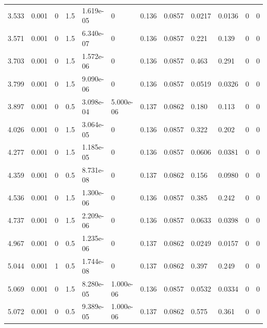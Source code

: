 \documentclass[preview]{standalone}
\begin{document}
{{\begin{tabular}{L{1.2cm}C{1.2cm} C{0.3cm}C{0.5cm} C{1.4cm}C{1.4cm} C{1.4cm}C{1.4cm} C{1.6cm}C{1.6cm} C{1.6cm}C{1.6cm}}
  3.533  &  0.001  & 0     & 1.5 &  1.619e-05  & 0  &  0.136&   0.0857& 0.0217 & 0.0136   &  0 & 0  \\ 
  3.571  &  0.001  & 0     & 1.5 &  6.340e-07  & 0  &  0.136&   0.0857& 0.221 & 0.139   &  0 & 0  \\ 
  3.703  &  0.001  & 0     & 1.5 &  1.572e-06  & 0  &  0.136&   0.0857& 0.463 & 0.291   &  0 & 0  \\ 
  3.799  &  0.001  & 0     & 1.5 &  9.090e-06  & 0  &  0.136&   0.0857& 0.0519 & 0.0326   &  0 & 0  \\ 
  3.897  &  0.001  & 0     & 0.5 &  3.098e-04  & 5.000e-06  &  0.137&   0.0862& 0.180 & 0.113   &  0 & 0  \\ 
  4.026  &  0.001  & 0     & 1.5 &  3.064e-05  & 0  &  0.136&   0.0857& 0.322 & 0.202   &  0 & 0  \\ 
  4.277  &  0.001  & 0     & 1.5 &  1.185e-05  & 0  &  0.136&   0.0857& 0.0606 & 0.0381   &  0 & 0  \\ 
  4.359  &  0.001  & 0     & 0.5 &  8.731e-08  & 0  &  0.137&   0.0862& 0.156 & 0.0980   &  0 & 0  \\ 
  4.536  &  0.001  & 0     & 1.5 &  1.300e-06  & 0  &  0.136&   0.0857& 0.385 & 0.242   &  0 & 0  \\ 
  4.737  &  0.001  & 0     & 1.5 &  2.209e-06  & 0  &  0.136&   0.0857& 0.0633 & 0.0398   &  0 & 0  \\ 
  4.967  &  0.001  & 0     & 0.5 &  1.235e-06  & 0  &  0.137&   0.0862& 0.0249 & 0.0157   &  0 & 0  \\ 
  5.044  &  0.001  & 1     & 0.5 &  1.744e-08  & 0  &  0.137&   0.0862& 0.397 & 0.249   &  0 & 0  \\ 
  5.069  &  0.001  & 0     & 1.5 &  8.280e-05  & 1.000e-06  &  0.136&   0.0857& 0.0532 & 0.0334   &  0 & 0  \\ 
  5.072  &  0.001  & 0     & 0.5 &  9.389e-05  & 1.000e-06  &  0.137&   0.0862& 0.575 & 0.361   &  0 & 0  \\ 
\hline 
\end{tabular} 

}}
\end{document}

